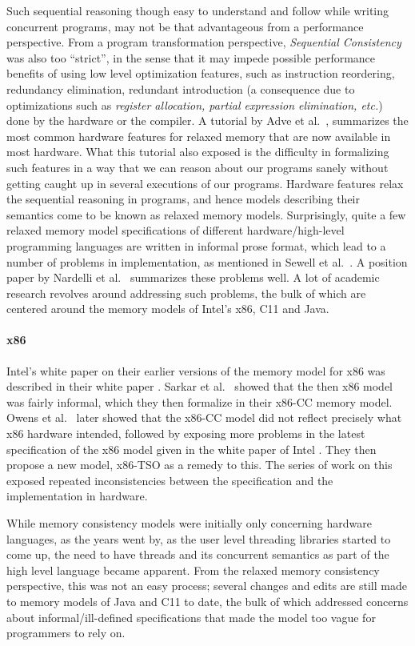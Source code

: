     Such sequential reasoning though easy to understand and follow while writing concurrent programs, may not be that advantageous from a performance perspective.
    From a program transformation perspective, \textit{Sequential Consistency} was also too ``strict'', in the sense that it may impede possible performance benefits of using low level optimization features, such as instruction reordering, redundancy elimination, redundant introduction (a consequence due to optimizations such as \textit{register allocation, partial expression elimination, etc.}) done by the hardware or the compiler.
    A tutorial by Adve et al.~\cite{AdveG}, summarizes the most common hardware features for relaxed memory that are now available in most hardware. 
    What this tutorial also exposed is the difficulty in formalizing such features in a way that we can reason about our programs sanely without getting caught up in several executions of our programs. 
    Hardware features relax the sequential reasoning in programs, and hence models describing their semantics come to be known as relaxed memory models.
    Surprisingly, quite a few relaxed memory model specifications of different hardware/high-level programming languages are written in informal prose format, which lead to a number of problems in implementation, as mentioned in Sewell et al.~\cite{Sewell}. 
    A position paper by Nardelli et al.~\cite{Nardelli} summarizes these problems well.
    A lot of academic research revolves around addressing such problems, the bulk of which are centered around the memory models of Intel's x86, C11 and Java.  
    
    \paragraph{x86}
    Intel's white paper on their earlier versions of the memory model for x86 was described in their white paper \cite{IntelW}.   
    Sarkar et al.~\cite{SarkarS} showed that the then x86 model was fairly informal, which they then formalize in their x86-CC memory model. 
    Owens et al.~\cite{OwensS} later showed that the x86-CC model did not reflect precisely what x86 hardware intended, followed by exposing more problems in the latest specification of the x86 model given in the white paper of Intel \cite{IntelW}. 
    They then propose a new model, x86-TSO as a remedy to this. 
    The series of work on this exposed repeated inconsistencies between the specification and the implementation in hardware. 
    
    While memory consistency models were initially only concerning hardware languages, as the years went by, as the user level threading libraries started to come up, the need to have threads and its concurrent semantics as part of the high level language became apparent.
    From the relaxed memory consistency perspective, this was not an easy process; several changes and edits are still made to memory models of Java and C11 to date, the bulk of which addressed concerns about informal/ill-defined specifications that made the model too vague for programmers to rely on. 
    
